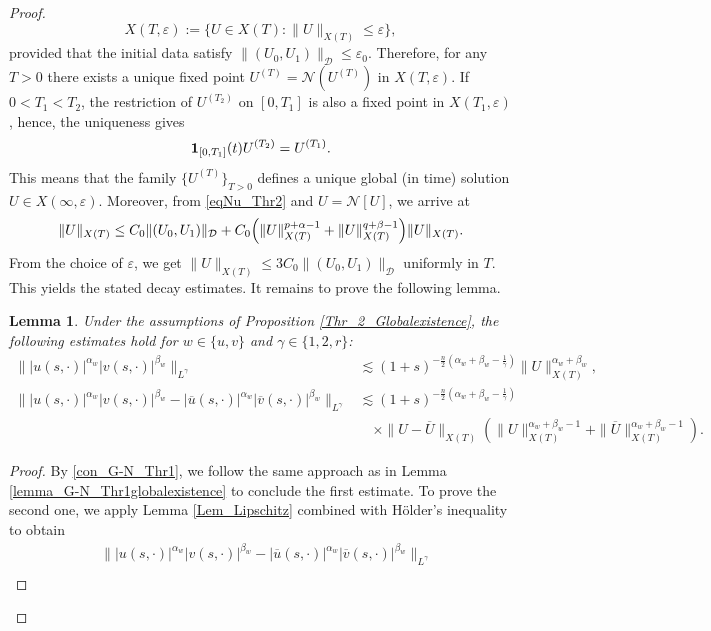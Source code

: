 \documentclass[11pt,reqno]{amsart}
\newtheorem{lemma}{Lemma}[section]
\newcommand{\tron}[1]{\left(#1\right)}
\begin{document}
\begin{proof}
\begin{equation*}
			X(T,\varepsilon):=\{U\in X(T):\|U\|_{X(T)}\leq \varepsilon\},
		\end{equation*}
		provided that the initial data satisfy $\|(U_0,U_1)\|_{\mathcal{D}}\leq \varepsilon_0$. Therefore, for any $T>0$ there exists a unique fixed point $U^{(T)}=\mathcal{N}(U^{(T)}) \text{ in } X(T,\varepsilon)$. If $0<T_1<T_2$, the restriction of $U^{(T_2)}$ on $[0,T_1]$ is also a fixed point in $X(T_1,\varepsilon)$, hence, the uniqueness gives
		\[
		{\bf 1}_{[0,T_1]}(t)U^{(T_2)}=U^{(T_1)}.
		\]
		This means that the family $\{U^{(T)}\}_{T>0}$ defines a unique global (in time) solution $U\in X(\infty,\varepsilon)$. Moreover, from \eqref{eqNu_Thr2} and $U=\mathcal{N}[U]$, we arrive at
		\[
		\|U\|_{X(T)}\leq C_0\|(U_0,U_1)\|_{\mathcal D}+C_0\Bigl(\|U\|_{X(T)}^{p+\alpha-1}+\|U\|_{X(T)}^{q+\beta-1}\Bigr)\|U\|_{X(T)}.
		\]
		From the choice of $\varepsilon$, we get $\|U\|_{X(T)}\leq 3C_0\|(U_0,U_1)\|_{\mathcal D}$ uniformly in $T$. This yields the stated decay estimates. It remains to prove the following lemma.
		\begin{lemma}\label{lemma_G-N_Thr2globalexistence}
			Under the assumptions of Proposition \ref{Thr_2_Globalexistence}, the following estimates hold for $w\in\{u,v\}$ and $\gamma\in\{1,2,r\}$:
			\begin{align*}
				\big\||u(s,\cdot)|^{\alpha_w}|v(s,\cdot)|^{\beta_w}\big\|_{L^{\gamma}} &\lesssim  (1+s)^{-\frac{n}{2}\tron{\alpha_w+\beta_w-\frac{1}{\gamma}}} \|U\|_{X(T)}^{\alpha_w+\beta_w},\\
				\big\||u(s,\cdot)|^{\alpha_w}|v(s,\cdot)|^{\beta_w}-|\overline u(s,\cdot)|^{\alpha_w}|\overline v(s,\cdot)|^{\beta_w}\big\|_{L^{\gamma}}&\lesssim (1+s)^{-\frac{n}{2}\tron{\alpha_w+\beta_w-\frac{1}{\gamma}}}\\
				&\quad\times \|U-\overline{U}\|_{X(T)}\tron{\|U\|^{\alpha_w+\beta_w-1}_{X(T)}+\|\overline{U}\|^{\alpha_w+\beta_w-1}_{X(T)}}.
			\end{align*}
		\end{lemma}
		\begin{proof}
			By \eqref{con_G-N_Thr1}, we follow the same approach as in Lemma \ref{lemma_G-N_Thr1globalexistence} to conclude the first estimate. To prove the second one, we apply Lemma \ref{Lem_Lipschitz} combined with H\"older's inequality to obtain
			\begin{equation}\label{embedding_Lipschitz}
				\begin{aligned}
					&\big\||u(s,\cdot)|^{\alpha_w}|v(s,\cdot)|^{\beta_w}-|\overline u(s,\cdot)|^{\alpha_w}|\overline v(s,\cdot)|^{\beta_w}\big\|_{L^{\gamma}} \\

\end{aligned}
\end{equation}
\end{proof}
\end{proof}
\end{document}
